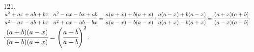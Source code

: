 121. $\cfrac{a^2+ax+ab+bx}{a^2-ax-ab+bx}\cdot\cfrac{a^2-ax-bx+ab}{a^2+ax-ab-bx}=\cfrac{a(a+x)+b(a+x)}{a(a-x)-b(a-x)}\cdot\cfrac{a(a-x)+b(a-x)}{a(a+x)-b(a+x)}=
\cfrac{(a+x)(a+b)}{(a-x)(a-b)}\cdot$\\$\cdot\cfrac{(a+b)(a-x)}{(a-b)(a+x)}=\left(\cfrac{a+b}{a-b}\right)^2.$\\
